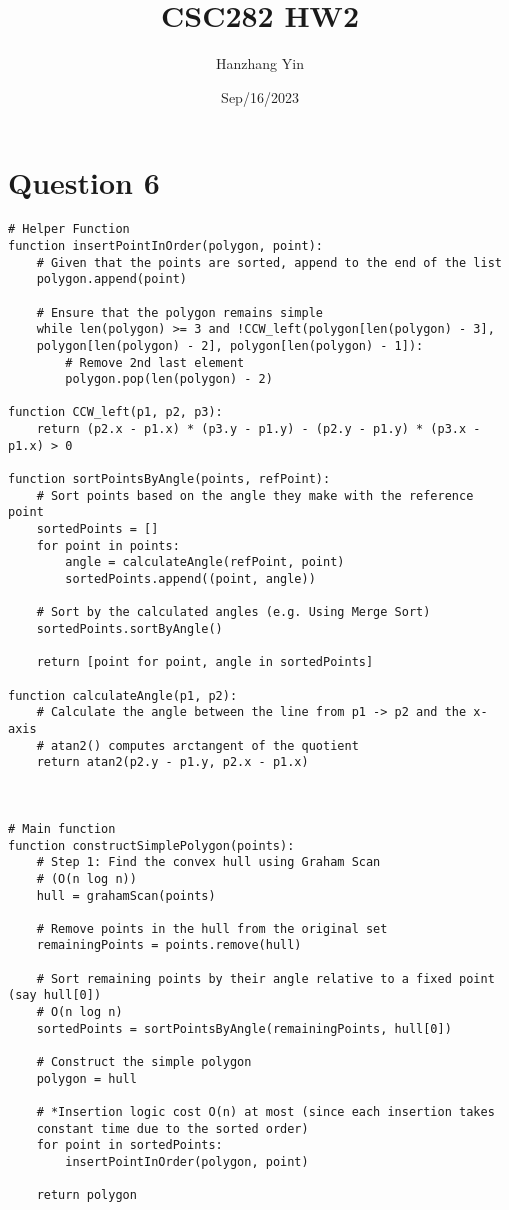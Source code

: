 \documentclass{article}
\title{CSC282 HW2}
\author{Hanzhang Yin}
\date{Sep/16/2023}
\begin{document}
\maketitle

\section*{Question 6}

\begin{verbatim}
# Helper Function
function insertPointInOrder(polygon, point):
    # Given that the points are sorted, append to the end of the list
    polygon.append(point)

    # Ensure that the polygon remains simple
    while len(polygon) >= 3 and !CCW_left(polygon[len(polygon) - 3], 
    polygon[len(polygon) - 2], polygon[len(polygon) - 1]):
        # Remove 2nd last element
        polygon.pop(len(polygon) - 2)

function CCW_left(p1, p2, p3):
    return (p2.x - p1.x) * (p3.y - p1.y) - (p2.y - p1.y) * (p3.x - p1.x) > 0

function sortPointsByAngle(points, refPoint):
    # Sort points based on the angle they make with the reference point
    sortedPoints = []
    for point in points:
        angle = calculateAngle(refPoint, point)
        sortedPoints.append((point, angle))
    
    # Sort by the calculated angles (e.g. Using Merge Sort)
    sortedPoints.sortByAngle()

    return [point for point, angle in sortedPoints]

function calculateAngle(p1, p2):
    # Calculate the angle between the line from p1 -> p2 and the x-axis
    # atan2() computes arctangent of the quotient
    return atan2(p2.y - p1.y, p2.x - p1.x)



# Main function
function constructSimplePolygon(points):
    # Step 1: Find the convex hull using Graham Scan 
    # (O(n log n))
    hull = grahamScan(points)  
    
    # Remove points in the hull from the original set
    remainingPoints = points.remove(hull)
    
    # Sort remaining points by their angle relative to a fixed point (say hull[0])
    # O(n log n)
    sortedPoints = sortPointsByAngle(remainingPoints, hull[0]) 
    
    # Construct the simple polygon
    polygon = hull

    # *Insertion logic cost O(n) at most (since each insertion takes 
    constant time due to the sorted order)
    for point in sortedPoints:
        insertPointInOrder(polygon, point)  

    return polygon
\end{verbatim}
\end{document}

